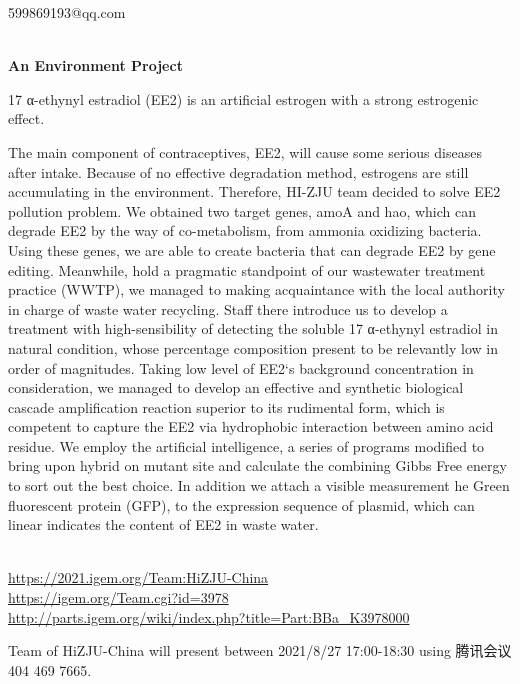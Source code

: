   599869193@qq.com

\textbf{\\An Environment Project\\}\begin{spacing}{1.5}

17 α-ethynyl estradiol (EE2) is an artificial estrogen with a strong estrogenic effect.

The main component of contraceptives, EE2, will cause some serious diseases after intake. Because of no effective degradation method, estrogens are still accumulating in the environment. Therefore, HI-ZJU team decided to solve EE2 pollution problem. We obtained two target genes, amoA and hao, which can degrade EE2 by the way of co-metabolism, from ammonia oxidizing bacteria. Using these genes, we are able to create bacteria that can degrade EE2 by gene editing. Meanwhile, hold a pragmatic standpoint of our wastewater treatment practice (WWTP), we managed to making acquaintance with the local authority in charge of waste water recycling. Staff there introduce us to develop a treatment with high-sensibility of detecting the soluble 17 α-ethynyl estradiol in natural condition, whose percentage composition present to be relevantly low in order of magnitudes. Taking low level of EE2‘s background concentration in consideration, we managed to develop an effective and synthetic biological cascade amplification reaction superior to its rudimental form, which is competent to capture the EE2 via hydrophobic interaction between amino acid residue. We employ the artificial intelligence, a series of programs modified to bring upon hybrid on mutant site and calculate the combining Gibbs Free energy to sort out the best choice. In addition we attach a visible measurement he Green fluorescent protein (GFP), to the expression sequence of plasmid, which can linear indicates the content of EE2 in waste water.\end{spacing}
\\

\url{https://2021.igem.org/Team:HiZJU-China }\\
\url{https://igem.org/Team.cgi?id=3978 }\\
\url{http://parts.igem.org/wiki/index.php?title=Part:BBa_K3978000 }\\


\vfill{}









Team of HiZJU-China will present between   2021/8/27 17:00-18:30      using 腾讯会议 404 469 7665.
\newpage


